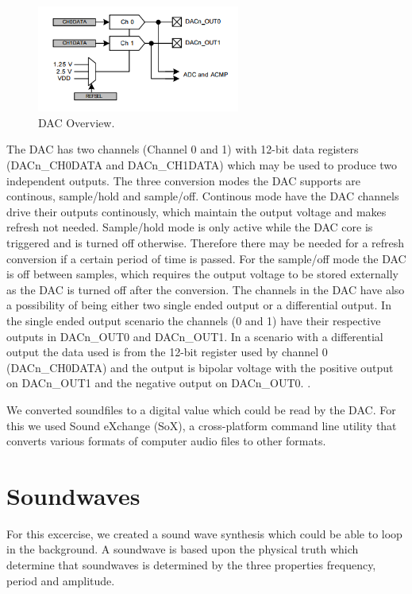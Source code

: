 \begin{figure}[hb]
  \centering
  \includegraphics[height=3.5cm]{images/DAC_view}
  \caption[DAC Overview]
   {DAC Overview. \cite{EFM32GGManual}}
\end{figure}

The DAC has two channels (Channel 0 and 1) with 12-bit data registers
(DACn\_CH0DATA and DACn\_CH1DATA) which may be used to produce two independent
outputs. The three conversion modes the DAC supports are continous, sample/hold
and sample/off. Continous mode have the DAC channels drive their outputs
continously, which maintain the output voltage and makes refresh not needed.
Sample/hold mode is only active while the DAC core is triggered and is turned
off otherwise. Therefore there may be needed for a refresh conversion if a
certain period of time is passed. For the sample/off mode the DAC is off between
samples, which requires the output voltage to be stored externally as the DAC is
turned off after the conversion. The channels in the DAC have also a possibility
of being either two single ended output or a differential output. In the single
ended output scenario the channels (0 and 1) have their respective outputs in
DACn\_OUT0 and DACn\_OUT1. In a scenario with a differential output the data
used is from the 12-bit register used by channel 0 (DACn\_CH0DATA) and the
output is bipolar voltage with the positive output on DACn\_OUT1 and the
negative output on DACn\_OUT0. \cite{EFM32GGManual}.

We converted soundfiles to a digital value which could be read by the DAC. For
this we used Sound eXchange (SoX), a cross-platform command line utility that
converts various formats of computer audio files to other formats. \cite{SoX}

\section{Soundwaves}

For this excercise, we created a sound wave synthesis which could be able to
loop in the background. A soundwave is based upon the physical truth which
determine that soundwaves is determined by the three properties frequency,
period and amplitude. \cite{TDT4528Compendium}

